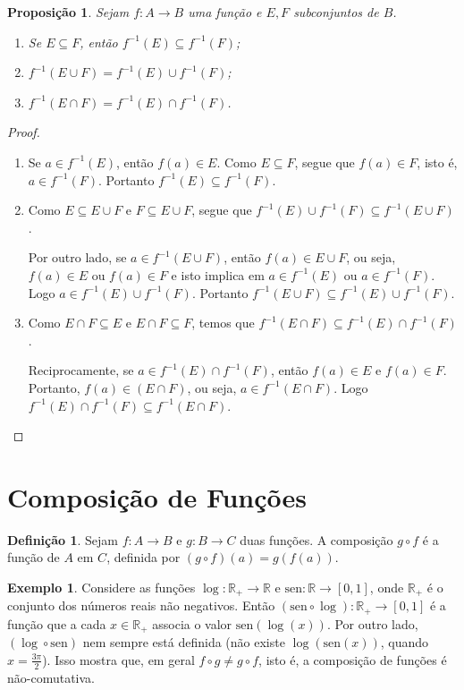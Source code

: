 \documentclass[a4paper,12pt]{monografia}
\theoremstyle{plain}
\newtheorem{proposition}{Proposi\c{c}\~ao}[section]
\theoremstyle{definition}
\newtheorem{definition}{Defini\c{c}\~ao}[section]
\newtheorem{example}{Exemplo}[section]
\theoremstyle{remark}
\newcommand{\R}{\mathbb{R}}
\begin{document}
\begin{proposition}\label{Img-inversa}
Sejam $f:A \rightarrow B$ uma fun\c{c}\~ao e $E, F$ subconjuntos de $B$.
\begin{enumerate}
    \item[(a)] Se $E \subseteq F$, ent\~ao $f^{-1}(E)\subseteq f^{-1}(F)$;
    \item[(b)] $f^{-1}(E \cup F)=f^{-1}(E)\cup f^{-1}(F)$;
    \item[(c)] $f^{-1}(E \cap F)=f^{-1}(E)\cap f^{-1}(F)$.
\end{enumerate}
\end{proposition}
\begin{proof}\mbox{}
\begin{enumerate}
    \item[(a)] Se $a \in f^{-1}(E)$, ent\~ao $f(a) \in E$.
    Como $E \subseteq F$, segue que $f(a) \in F$, isto \'e,
    $a \in f^{-1}(F)$. Portanto $f^{-1}(E)\subseteq f^{-1}(F)$.
    \item[(b)] Como $E \subseteq E \cup F$ e $F \subseteq E \cup
    F$, segue que $f^{-1}(E) \cup f^{-1}(F) \subseteq f^{-1}(E \cup
    F)$.

    Por outro lado, se $a \in f^{-1}(E \cup F)$, ent\~ao $f(a) \in E
    \cup F$, ou seja, $f(a) \in E$ ou $f(a) \in F$ e isto implica em
    $a \in f^{-1}(E)$ ou $a \in f^{-1}(F)$. Logo $a \in
    f^{-1}(E)\cup f^{-1}(F)$. Portanto $f^{-1}(E \cup F)
    \subseteq f^{-1}(E)\cup f^{-1}(F)$.
    \item[(c)] Como $E \cap F \subseteq E$ e $E \cap F \subseteq
    F$, temos que $f^{-1}(E \cap F)\subseteq f^{-1}(E)\cap
    f^{-1}(F)$.

    Reciprocamente, se $a \in f^{-1}(E) \cap f^{-1}(F)$, ent\~ao
    $f(a) \in E$ e $f(a) \in F$. Portanto, $f(a) \in (E \cap
    F)$, ou seja, $a \in f^{-1}(E \cap F)$. Logo $f^{-1}(E)
    \cap f^{-1}(F) \subseteq f^{-1}(E \cap F)$.
\end{enumerate}
\end{proof}

\section{Composi\c{c}\~ao de Fun\c{c}\~oes}
\begin{definition}
Sejam $f:A \rightarrow B$ e $g:B \rightarrow C$ duas fun\c{c}\~oes. A
composi\c{c}\~ao $g \circ f$ \'e a fun\c{c}\~ao de $A$ em $C$, definida por $(g
\circ f)(a)=g(f(a))$.
\end{definition}
\begin{example}\label{log-sen}
Considere as fun\c{c}\~oes $\log :\R_+ \rightarrow \R$ e $\mbox{sen}:\R
\rightarrow [0,1]$, onde $\R_+$ \'e o conjunto dos n\'umeros reais n\~ao
negativos. Ent\~ao $(\mbox{sen} \circ \log):\R_+ \rightarrow [0,1]$
\'e a fun\c{c}\~ao que a cada $x \in \R_+$ associa o valor
$\mbox{sen}(\log(x))$. Por outro lado, $(\log \circ \mbox{sen})$
nem sempre est\'a definida (n\~ao existe $\log( \mbox{sen}(x))$,
quando $x= \frac{3\pi}{2}$). Isso mostra que, em geral $f \circ g
\neq g \circ f$, isto \'e, a composi\c{c}\~ao de fun\c{c}\~oes \'e n\~ao-comutativa.
\end{example}
\end{document}
